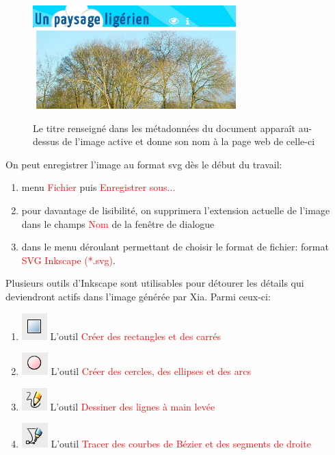 \documentclass[a4paper,12pt]{report}
\newcommand{\chemin}[1]{\textcolor{red}{#1}}
\begin{document}
\begin{figure}[htp]
 \centering
 \caption{Le titre renseigné dans les métadonnées du document apparaît au-dessus de l'image active 
 et donne son nom à la page web de celle-ci}
 \includegraphics[width=0.7\textwidth]{images/titre_ia}
 \label{titre_ia}
\end{figure}

On peut enregistrer l'image au format svg dès le début du travail:
\begin{enumerate}
 \item menu \chemin{Fichier} puis \chemin{Enregistrer sous...}
 \item pour davantage de lisibilité, on supprimera l'extension actuelle de l'image dans le champs \chemin{Nom} 
 de la fenêtre de dialogue
 \item dans le menu déroulant permettant de choisir le format de fichier: format \chemin{SVG Inkscape (*.svg)}.
\end{enumerate}

Plusieurs outils d'Inkscape sont utilisables pour détourer les détails qui deviendront actifs dans l'image générée 
par Xia. Parmi ceux-ci:
\begin{enumerate}
 \item \includegraphics[scale=0.5]{./images/rec_carre} L'outil \chemin{Créer des rectangles et des carrés}
 \item \includegraphics[scale=0.5]{./images/cercles} L'outil \chemin{Créer des cercles, des ellipses et des arcs}
 \item \includegraphics[scale=0.5]{./images/lignes} L'outil \chemin{Dessiner des lignes à main levée}
 \item \includegraphics[scale=0.5]{./images/bezier} L'outil \chemin{Tracer des courbes de Bézier et des segments de droite}
\end{enumerate}
\end{document}
